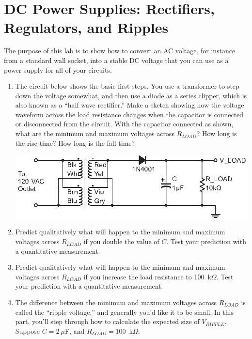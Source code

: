 \section{DC Power Supplies: Rectifiers, Regulators, and Ripples}
\label{lab_power_supply}


\bigskip

The purpose of this lab is to show how to convert an AC voltage, for instance from a standard wall socket, into a stable DC voltage that you can use as a power supply for all of your circuits.

\begin{enumerate}[wide]

\item The circuit below shows the basic first steps.  You use a transformer to step down the voltage somewhat, and then use a diode as a series clipper, which is also known as a ``half wave rectifier.''  Make a sketch showing how the voltage waveform across the load resistance  changes when the capacitor is connected or disconnected from the circuit.  With the capacitor connected as shown, what are the minimum and maximum voltages across $R_{LOAD}$?  How long is the rise time?  How long is the fall time?
\begin{center}
\includegraphics{power_supply/half_wave_rectifier.eps}
\end{center}

\item Predict qualitatively what will happen to the minimum and maximum voltages across $R_{LOAD}$ if you double the value of $C$.  Test your prediction with a quantitative measurement.  

\item Predict qualitatively what will happen to the minimum and maximum voltages across $R_{LOAD}$ if you increase the load resistance to 100~k$\Omega$.  Test your prediction with a quantitative measurement. \label{part_ripple_measured}

\item The difference between the minimum and maximum voltages across $R_{LOAD}$ is called the ``ripple voltage,'' and generally you'd like it to be small.  In this part, you'll step through how to calculate the expected size of $V_{RIPPLE}$.  Suppose $C = 2~\mu$F, and $R_{LOAD}= 100$~k$\Omega$. \label{part_ripple_defined}


\end{enumerate}
